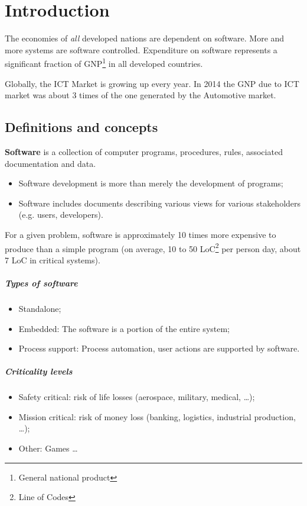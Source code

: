 \chapter{Introduction}
The economies of \textit{all} developed nations are dependent on software. More and more systems are software controlled. Expenditure on software represents a significant fraction of GNP\footnote{General national product} in all developed countries.

Globally, the ICT Market is growing up every year. In 2014 the GNP due to ICT market was about 3 times of the one generated by the Automotive market.

\section{Definitions and concepts}
\textbf{Software} is a collection of computer programs, procedures, rules, associated documentation and data.
\begin{itemize}
\item Software development is more than merely the development of programs;
\item Software includes documents describing various views for various stakeholders (e.g. users, developers).
\end{itemize}
For a given problem, software is approximately 10 times more expensive to produce than a simple program (on average, 10 to 50 LoC\footnote{Line of Codes} per person day, about 7 LoC in critical systems).

\paragraph{Types of software}
\begin{itemize}
\item Standalone;
\item Embedded: The software is a portion of the entire system;
\item Process support: Process automation, user actions are supported by software.
\end{itemize}

\paragraph{Criticality levels}
\begin{itemize}
\item Safety critical: risk of life losses (aerospace, military, medical, \dots);
\item Mission critical: risk of money loss (banking, logistics, industrial production, \dots);
\item Other: Games \dots
\end{itemize}

